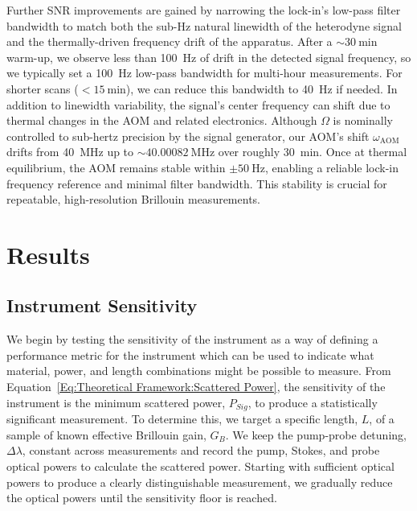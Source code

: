 Further \ac{SNR} improvements are gained by narrowing the lock-in’s low-pass filter bandwidth to match both the sub-\si{\hertz} natural linewidth of the heterodyne signal and the thermally-driven frequency drift of the apparatus. After a \(\sim\!\SI{30}{\minute}\) warm-up, we observe less than \SI{100}{\hertz} of drift in the detected signal frequency, so we typically set a \SI{100}{\hertz} low-pass bandwidth for multi-hour measurements. For shorter scans (\(< \SI{15}{\minute}\)), we can reduce this bandwidth to \SI{40}{\hertz} if needed. In addition to linewidth variability, the signal’s center frequency can shift due to thermal changes in the \ac{AOM} and related electronics. Although \(\Omega\) is nominally controlled to sub-hertz precision by the signal generator, our \ac{AOM}’s shift \(\omega_{\mathrm{AOM}}\) drifts from \SI{40}{\mega\hertz} up to \(\sim\!\SI{40.00082}{\mega\hertz}\) over roughly \SI{30}{\minute}. Once at thermal equilibrium, the \ac{AOM} remains stable within \(\pm\SI{50}{\hertz}\), enabling a reliable lock-in frequency reference and minimal filter bandwidth. This stability is crucial for repeatable, high-resolution Brillouin measurements.

\section{Results}\label{Results}
\subsection{Instrument Sensitivity}
\label{Results:Instrument sensitivity and SBS comparison}

We begin by testing the sensitivity of the instrument as a way of defining a performance metric for the instrument which can be used to indicate what material, power, and length combinations might be possible to measure. From Equation~\ref{Eq:Theoretical Framework:Scattered Power}, the sensitivity of the instrument is the minimum scattered power, \(P_{Sig}\), to produce a statistically significant measurement. To determine this, we target a specific length, \(L\), of a sample of known effective Brillouin gain, \(G_B\). We keep the pump-probe detuning, \(\Delta\lambda\), constant across measurements and record the pump, Stokes, and probe optical powers to calculate the scattered power. Starting with sufficient optical powers to produce a clearly distinguishable measurement, we gradually reduce the optical powers until the sensitivity floor is reached.

